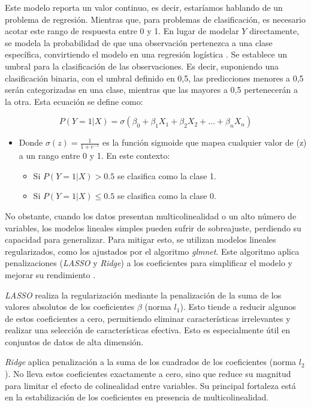 Este modelo reporta un valor continuo, es decir, estaríamos hablando de un problema de regresión. Mientras que, para problemas de clasificación, es necesario acotar este rango de respuesta entre 0 y 1. En lugar de modelar $Y$ directamente, se modela la probabilidad de que una observación pertenezca a una clase específica, convirtiendo el modelo en una regresión logística \cite{hosmer2013applied}. Se establece un umbral para la clasificación de las observaciones. Es decir, suponiendo una clasificación binaria, con el umbral definido en 0,5, las predicciones menores a 0,5 serán categorizadas en una clase, mientras que las mayores a 0,5 pertenecerán a la otra. Esta ecuación se define como:

\begin{equation}
P(Y=1 | X) = \sigma(\beta_0 + \beta_1 X_1 + \beta_2 X_2 + \ldots + \beta_n X_n)
\end{equation}
\begin{itemize}
\item Donde $\sigma(z)= \frac{1}{1 + e^{-z}}$ es la función sigmoide que mapea cualquier valor de (z) a un rango entre 0 y 1. En este contexto:
\begin{itemize}
\item Si $P(Y=1 | X) > 0.5$ se clasifica como la clase 1.
\item Si $P(Y=1 | X) \leq 0.5$ se clasifica como la clase 0.
\end{itemize}
\end{itemize}

No obstante, cuando los datos presentan multicolinealidad o un alto número de variables, los modelos lineales simples pueden sufrir de sobreajuste, perdiendo su capacidad para generalizar. Para mitigar esto, se utilizan modelos lineales regularizados, como los ajustados por el algoritmo \textit{glmnet}. Este algoritmo aplica penalizaciones (\textit{LASSO} y \textit{Ridge}) a los coeficientes para simplificar el modelo y mejorar su rendimiento \cite{friedman2010regularization}.

\textit{LASSO} realiza la regularización mediante la penalización de la suma de los valores absolutos de los coeficientes $\beta$ (norma $l_1$). Esto tiende a reducir algunos de estos coeficientes a cero, permitiendo eliminar características irrelevantes y realizar una selección de características efectiva. Esto es especialmente útil en conjuntos de datos de alta dimensión.

\textit{Ridge} aplica penalización a la suma de los cuadrados de los coeficientes (norma $l_2$). No lleva estos coeficientes exactamente a cero, sino que reduce su magnitud para limitar el efecto de colinealidad entre variables. Su principal fortaleza está en la estabilización de los coeficientes en presencia de multicolinealidad.

